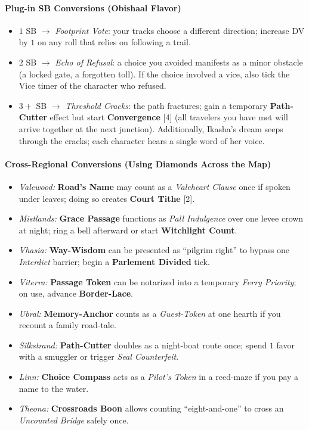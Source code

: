 \paragraph{Plug-in SB Conversions (Obishaal Flavor)}
\begin{itemize}
  \item $1$ SB $\rightarrow$ \emph{Footprint Vote}: your tracks choose a different direction; increase DV by $1$ on any roll that relies on following a trail.
  \item $2$ SB $\rightarrow$ \emph{Echo of Refusal}: a choice you avoided manifests as a minor obstacle (a locked gate, a forgotten toll). If the choice involved a vice, also tick the Vice timer of the character who refused.
  \item $3+$ SB $\rightarrow$ \emph{Threshold Cracks}: the path fractures; gain a temporary \textbf{Path-Cutter} effect but start \textbf{Convergence} [4] (all travelers you have met will arrive together at the next junction). Additionally, Ikasha's dream seeps through the cracks; each character hears a single word of her voice.
\end{itemize}

\paragraph{Cross-Regional Conversions (Using Diamonds Across the Map)}
\begin{itemize}
  \item \emph{Valewood:} \textbf{Road's Name} may count as a \emph{Valeheart Clause} once if spoken under leaves; doing so creates \textbf{Court Tithe} [2].
  \item \emph{Mistlands:} \textbf{Grace Passage} functions as \emph{Pall Indulgence} over one levee crown at night; ring a bell afterward or start \textbf{Witchlight Count}.
  \item \emph{Vhasia:} \textbf{Way-Wisdom} can be presented as ``pilgrim right'' to bypass one \emph{Interdict} barrier; begin a \textbf{Parlement Divided} tick.
  \item \emph{Viterra:} \textbf{Passage Token} can be notarized into a temporary \emph{Ferry Priority}; on use, advance \textbf{Border-Lace}.
  \item \emph{Ubral:} \textbf{Memory-Anchor} counts as a \emph{Guest-Token} at one hearth if you recount a family road-tale.
  \item \emph{Silkstrand:} \textbf{Path-Cutter} doubles as a night-boat route once; spend $1$ favor with a smuggler or trigger \emph{Seal Counterfeit}.
  \item \emph{Linn:} \textbf{Choice Compass} acts as a \emph{Pilot's Token} in a reed-maze if you pay a name to the water.
  \item \emph{Theona:} \textbf{Crossroads Boon} allows counting ``eight-and-one'' to cross an \emph{Uncounted Bridge} safely once.
\end{itemize}

